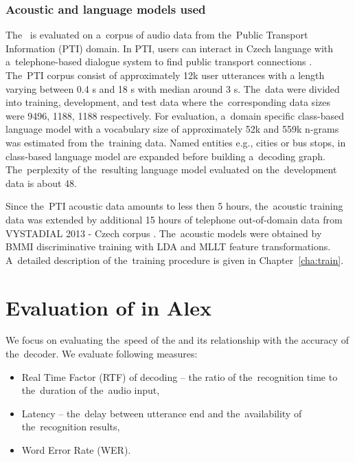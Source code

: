 \subsubsection*{Acoustic and language models used}
\label{sec:ptilm}
The~ is evaluated on a~corpus of audio data from the~Public Transport Information (PTI) domain.
In PTI, users can interact in Czech language with a~telephone-based dialogue system to find public transport connections \cite{ptics2014url}.
The~PTI corpus consist of approximately 12k user utterances with a length varying between 0.4 s and 18 s with median around 3 s.
The~data were divided into training, development, and test data where the~corresponding data sizes were 9496, 1188, 1188 respectively.
For evaluation, a~domain specific class-based language model with a vocabulary size of approximately 52k  and 559k n-grams was estimated from the~training data.
Named entities e.g., cities or bus stops, in class-based language model are expanded before building a~decoding graph.
The~perplexity of the~resulting language model evaluated on the~development data is about 48.

Since the~PTI acoustic data amounts to less then 5 hours, the~acoustic training data was extended by additional 15 hours of telephone out-of-domain data from VYSTADIAL 2013 - Czech corpus \cite{korvas_2014}.
The~acoustic models were obtained by BMMI discriminative training with LDA and MLLT feature transformations.
A~detailed description of the~training procedure is given in Chapter~\ref{cha:train}. 




\section{Evaluation of  in Alex}
\label{sec:eval}
We focus on evaluating the~speed of the  and its relationship with the accuracy of the~decoder.
We evaluate following measures:
\begin{itemize}
    \item Real Time Factor (RTF) of decoding -- the ratio of the~recognition time to the~duration of the~audio input,
    \item Latency -- the~delay between utterance end and the~availability of the~recognition results,
    \item Word Error Rate (WER).
\end{itemize}

